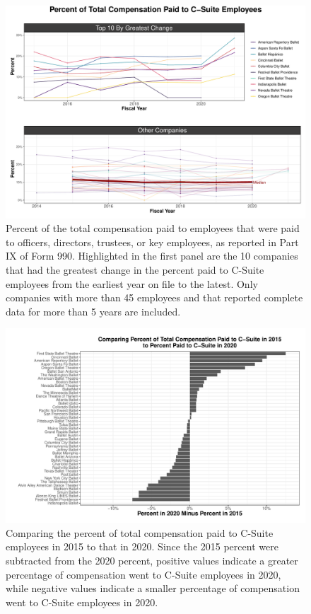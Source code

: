 \documentclass[Dance Data
Project,article,submit,moreauthors,pdftex]{mdpi}
\begin{document}
\begin{figure}[H]
\includegraphics[width=0.9\linewidth,]{../images/frac-comp} \caption{\label{fig:frac-comp} Percent of the total compensation paid to employees that were paid to officers, directors, trustees, or key employees, as reported in Part IX of Form 990. Highlighted in the first panel are the 10 companies that had the greatest change in the percent paid to C-Suite employees from the earliest year on file to the latest. Only companies with more than 45 employees and that reported complete data for more than 5 years are included.}\label{fig:unnamed-chunk-17}
\end{figure}

\begin{figure}[H]
\includegraphics[width=0.9\linewidth,]{../images/csuite-comp-bar} \caption{\label{fig:csuite-comp-bar} Comparing the percent of total compensation paid to C-Suite employees in 2015 to that in 2020. Since the 2015 percent were subtracted from the 2020 percent, positive values indicate a greater percentage of compensation went to C-Suite employees in 2020, while negative values indicate a smaller percentage of compensation went to C-Suite employees in 2020.}\label{fig:unnamed-chunk-18}
\end{figure}
\end{document}
